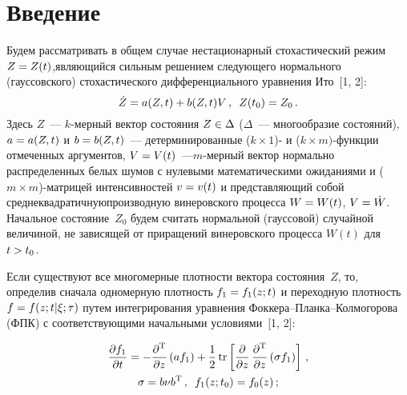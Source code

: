       \begin{multicols}{2}

            \label{st\stat}
     
\section{Введение}
     
    Будем рассматривать в общем случае неста\-ционарный стохастический 
режим $Z\hm=Z(t)$,\linebreak явля\-ющий\-ся сильным решением следующего нормального 
(гауссовского) стохастического дифференциального урав\-не\-ния Ито~[1, 2]:
    \begin{equation}
    \dot{Z}=a(Z,t)+b(Z,t)V\,,\enskip Z(t_0)=Z_0\,.
    \label{e1-sin}
    \end{equation}
Здесь $Z$~--- $k$-мер\-ный вектор со\-сто\-яния $Z\hm\in \Delta$ ($\Delta$~--- 
многообразие со\-сто\-яний), $a\hm=a(Z,t)$ и $b\hm=b(Z,t)$~--- 
детерминированные ($k\times1$)- и ($k\times m)$-функ\-ции отмечен\-ных 
аргументов, $V\hm=V(t)$~---\linebreak $m$-мер\-ный вектор нормально распределенных 
\mbox{белых} шумов с нулевыми математическими ожиданиями и 
($m\times m$)-мат\-ри\-цей интенсивностей $v\hm=v(t)$ и пред\-став\-ля\-ющий 
собой среднеквадратичную\linebreak производную винеровского процесса $W\hm=W(t)$, %
$V\hm=\dot{W}$. Начальное со\-сто\-яние~$Z_0$ будем считать нормальной 
(гауссовой) случайной величиной, не зависящей от приращений винеровского 
процесса $W(t)$ для $t\hm>t_0$.
    
    Если существуют все многомерные плот\-ности вектора со\-сто\-яния~$Z$, то, 
определив сначала одномерную плот\-ность $f_1\hm=f_1(z;t)$ и переходную 
плот\-ность $f\hm=f(z;t\vert \xi;\tau)$ путем интегрирования урав\-не\-ния 
    Фок\-ке\-ра--План\-ка--Кол\-мо\-го\-ро\-ва (ФПК) с соответствующими 
начальными услови\-ями~[1, 2]:

\noindent
    \begin{multline}
    \displaystyle\frac{\displaystyle \partial f_1\mathstrut}{\displaystyle \partial t\mathstrut} = -\displaystyle\frac{\displaystyle \partial^{\mathrm{T}}\mathstrut}{\displaystyle \partial z\mathstrut}\left( af_1\right) 
+\displaystyle\frac{\displaystyle 1\mathstrut}{\displaystyle 2\mathstrut}\,\mathrm{tr}\left[ \displaystyle\frac{\displaystyle \partial\mathstrut}{\displaystyle \partial z\mathstrut}\,\displaystyle\frac{\displaystyle \partial^{\mathrm{T}}\mathstrut}{\displaystyle \partial z\mathstrut}\left( 
\sigma f_1\right) \right]\,,\\
    \sigma=b\nu b^{\mathrm{T}}\,,\enskip f_1(z;t_0)=f_0(z)\,;
    \label{e2-sin}
    \end{multline}
    

\end{multicols}
